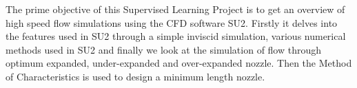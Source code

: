 The prime objective of this Supervised Learning Project is to get an overview of high speed flow simulations using the CFD software SU2. Firstly it delves into the features used in SU2 through a simple inviscid simulation, various numerical methods used in SU2 and finally we look at the simulation of flow through optimum expanded, under-expanded and over-expanded nozzle. Then the Method of Characteristics is used to design a minimum length nozzle.